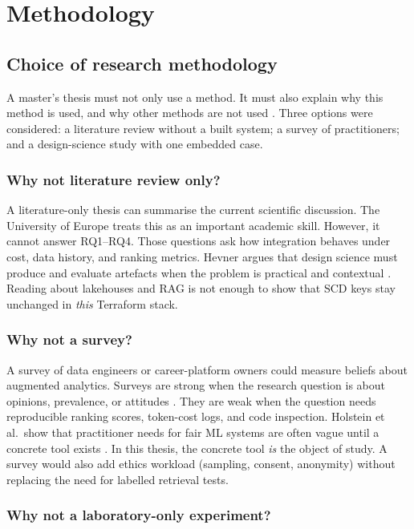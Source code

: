 \chapter{Methodology}
\label{ch:method}

\section{Choice of research methodology}
\label{sec:method-choice}

A master's thesis must not only use a method. It must also explain why this method is used, and why other methods are not used . Three options were considered: a literature review without a built system; a survey of practitioners; and a design-science study with one embedded case.

\subsection{Why not literature review only?}

A literature-only thesis can summarise the current scientific discussion. The University of Europe treats this as an important academic skill. However, it cannot answer RQ1--RQ4. Those questions ask how integration behaves under cost, data history, and ranking metrics. Hevner argues that design science must produce and evaluate artefacts when the problem is practical and contextual . Reading about lakehouses and RAG is not enough to show that SCD keys stay unchanged in \emph{this} Terraform stack.

\subsection{Why not a survey?}

A survey of data engineers or career-platform owners could measure beliefs about augmented analytics. Surveys are strong when the research question is about opinions, prevalence, or attitudes . They are weak when the question needs reproducible ranking scores, token-cost logs, and code inspection. Holstein et al.\ show that practitioner needs for fair ML systems are often vague until a concrete tool exists . In this thesis, the concrete tool \emph{is} the object of study. A survey would also add ethics workload (sampling, consent, anonymity) without replacing the need for labelled retrieval tests.

\subsection{Why not a laboratory-only experiment?}

